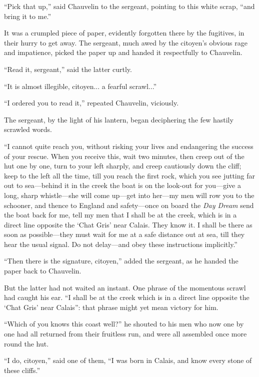 \documentclass[paper=a5,BCOR=7mm,twoside,DIV=calc,12pt,usegeometry,chapterprefix,endperiod,headings=big]{scrbook}
\begin{document}
\enquote{Pick that up,} said Chauvelin to the sergeant, pointing to this white scrap, \enquote{and bring it to me.}

It was a crumpled piece of paper, evidently forgotten there by the fugitives, in their hurry to get away. The sergeant, much awed by the citoyen's obvious rage and impatience, picked the paper up and handed it respectfully to Chauvelin.

\enquote{Read it, sergeant,} said the latter curtly.

\enquote{It is almost illegible, citoyen... a fearful scrawl...}

\enquote{I ordered you to read it,} repeated Chauvelin, viciously.

The sergeant, by the light of his lantern, began deciphering the few hastily scrawled words.

\enquote{I cannot quite reach you, without risking your lives and endangering the success of your rescue. When you receive this, wait two minutes, then creep out of the hut one by one, turn to your left sharply, and creep cautiously down the cliff; keep to the left all the time, till you reach the first rock, which you see jutting far out to sea---behind it in the creek the boat is on the look-out for you---give a long, sharp whistle---she will come up---get into her---my men will row you to the schooner, and thence to England and safety---once on board the \textit{Day Dream} send the boat back for me, tell my men that I shall be at the creek, which is in a direct line opposite the \enquote{Chat Gris} near Calais. They know it. I shall be there as soon as possible---they must wait for me at a safe distance out at sea, till they hear the usual signal. Do not delay---and obey these instructions implicitly.}

\enquote{Then there is the signature, citoyen,} added the sergeant, as he handed the paper back to Chauvelin.

But the latter had not waited an instant. One phrase of the momentous scrawl had caught his ear. \enquote{I shall be at the creek which is in a direct line opposite the \enquote{Chat Gris} near Calais}: that phrase might yet mean victory for him.

\enquote{Which of you knows this coast well?} he shouted to his men who now one by one had all returned from their fruitless run, and were all assembled once more round the hut.

\enquote{I do, citoyen,} said one of them, \enquote{I was born in Calais, and know every stone of these cliffs.}
\end{document}
